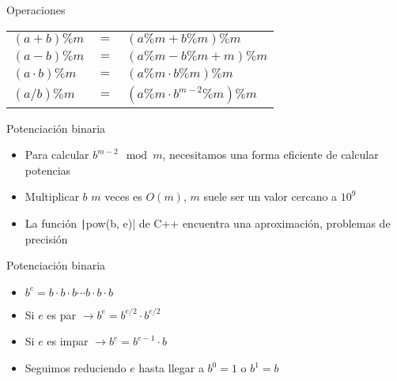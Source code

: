 \documentclass[10pt]{beamer}
\newcommand{\bi}{\begin{itemize}}
\newcommand{\ei}{\end{itemize}}
\begin{document}
\begin{frame}{Operaciones}
  \begin{center}
    \begin{tabular}{lcl}
      $(a + b) \% m$     & $=$ & $(a \% m + b \% m) \% m$ \\[10pt]
      $(a - b) \% m$     & $=$ & $(a \% m - b \% m + m) \% m$ \\[10pt]
      $(a \cdot b) \% m$ & $=$ & $(a \% m \cdot b \% m) \% m$ \\[10pt]
      $(a / b) \% m$     & $=$ & $(a \% m \cdot b^{m-2} \% m) \% m$ \\
    \end{tabular}
  \end{center}
\end{frame}

\begin{frame}{Potenciación binaria}
  \bi
    \item Para calcular $b^{m-2} \mod m$, necesitamos una forma eficiente de calcular potencias
    \item Multiplicar $b$ $m$ veces es $O(m)$, $m$ suele ser un valor cercano a $10^9$
    \item<2-> La función \texttt|pow(b, e)| de C++ encuentra una aproximación, problemas de precisión
  \ei
\end{frame}

\begin{frame}{Potenciación binaria}
  \bi
    \item $b^e = b \cdot b \cdot b \cdots b \cdot b \cdot b$
    \item<2-> Si $e$ es par $\rightarrow b^e = b^{e/2} \cdot b^{e/2}$
    \item<3-> Si $e$ es impar $\rightarrow b^e = b^{e-1} \cdot b$
    \item<4-> Seguimos reduciendo $e$ hasta llegar a $b^0 = 1$ o $b^1 = b$
  \ei
\end{frame}
\end{document}
